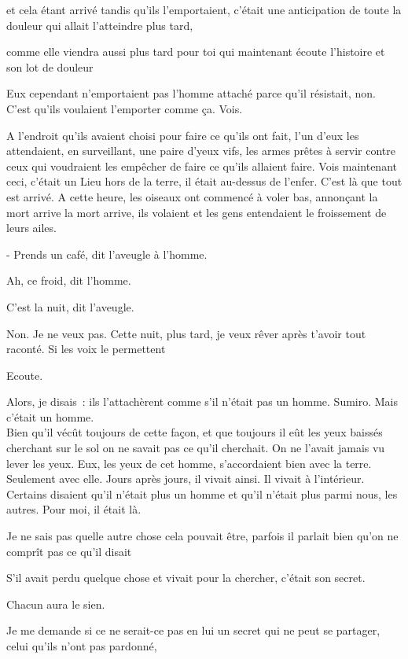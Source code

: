 et cela étant arrivé tandis qu'ils l'emportaient, c'était une
anticipation de toute la douleur qui allait l'atteindre plus tard,

comme elle viendra aussi plus tard pour toi qui maintenant écoute
l'histoire et son lot de douleur

Eux cependant n'emportaient pas l'homme attaché parce qu'il résistait,
non. C'est qu'ils voulaient l'emporter comme ça. Vois.

A l'endroit qu'ils avaient choisi pour faire ce qu'ils ont fait, l'un
d'eux les attendaient, en surveillant, une paire d'yeux vifs, les armes
prêtes à servir contre ceux qui voudraient les empêcher de faire ce
qu'ils allaient faire. Vois maintenant ceci, c'était un Lieu hors de la
terre, il était au-dessus de l'enfer. C'est là que tout est arrivé. A
cette heure, les oiseaux ont commencé à voler bas, annonçant la mort
arrive la mort arrive, ils volaient et les gens entendaient le
froissement de leurs ailes.

- Prends un café, dit l'aveugle à l'homme.

Ah, ce froid, dit l'homme.

C'est la nuit, dit l'aveugle.

Non. Je ne veux pas. Cette nuit, plus tard, je veux rêver après t'avoir
tout raconté. Si les voix le permettent

Ecoute.

Alors, je disais~: ils l'attachèrent comme s'il n'était pas un homme.
Sumiro. Mais c'était un homme.\\

Bien qu'il vécût toujours de cette façon, et que toujours il eût les
yeux baissés cherchant sur le sol on ne savait pas ce qu'il cherchait.
On ne l'avait jamais vu lever les yeux. Eux, les yeux de cet homme,
s'accordaient bien avec la terre. Seulement avec elle. Jours après
jours, il vivait ainsi. Il vivait à l'intérieur. Certains disaient qu'il
n'était plus un homme et qu'il n'était plus parmi nous, les autres. Pour
moi, il était là.

Je ne sais pas quelle autre chose cela pouvait être, parfois il parlait
bien qu'on ne comprît pas ce qu'il disait

S'il avait perdu quelque chose et vivait pour la chercher, c'était son
secret.

Chacun aura le sien.

Je me demande si ce ne serait-ce pas en lui un secret qui ne peut se
partager, celui qu'ils n'ont pas pardonné,

